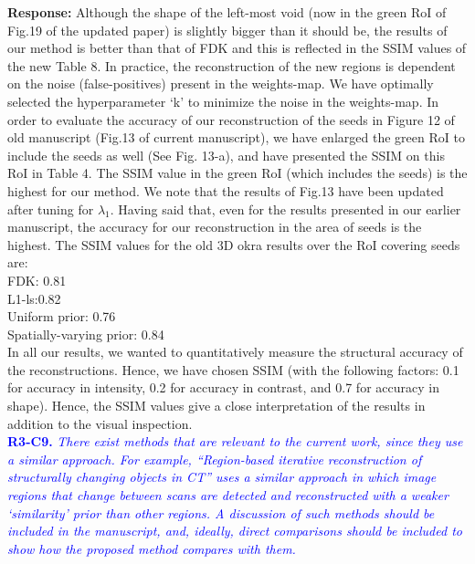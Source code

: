 \documentclass{article}
\begin{document}
\textbf{Response:}  Although the shape of the left-most void (now in the green RoI of Fig.19 of the updated paper) is slightly bigger than it should be, the results of our method is better than that of FDK and this is reflected in the SSIM values of the new Table 8. In practice, the reconstruction of the new regions is dependent on the noise (false-positives) present in the weights-map.  We have optimally selected the hyperparameter `k' to minimize the noise in the weights-map. 
In order to evaluate the accuracy of our reconstruction of the seeds in Figure 12 of old manuscript (Fig.13 of current manuscript), we have enlarged the green RoI to include the seeds as well (See Fig. 13-a), and have presented the SSIM on this RoI in Table 4. The SSIM value in the green RoI (which includes the seeds) is the highest for our method. We note that the results of Fig.13 have been updated after tuning for $\lambda_1$. Having said that, even for the results presented in our earlier manuscript, the accuracy for our reconstruction in the area of seeds is the highest.
The SSIM values for the old 3D okra results over the RoI covering seeds are:\\
FDK: 0.81\\
L1-ls:0.82\\
Uniform prior: 0.76\\
Spatially-varying prior: 0.84 \\
In all our results, we wanted to quantitatively measure the structural accuracy of the reconstructions. Hence, we have chosen SSIM (with the following factors: 0.1 for accuracy in intensity, 0.2 for accuracy in contrast, and 0.7 for accuracy in shape). Hence, the SSIM values give a close interpretation of the results in addition to the visual inspection. \\

\textcolor{blue}{\textbf{R3-C9.}\textit{ There exist methods that are relevant to the current work, since they use a similar approach. For example, ``Region-based iterative reconstruction of structurally changing objects in CT'' uses a similar approach in which image regions that change between scans are detected and reconstructed with a weaker `similarity' prior than other regions. A discussion of such methods should be included in the manuscript, and, ideally, direct comparisons should be included to show how the proposed method compares with them.}}
\end{document}
